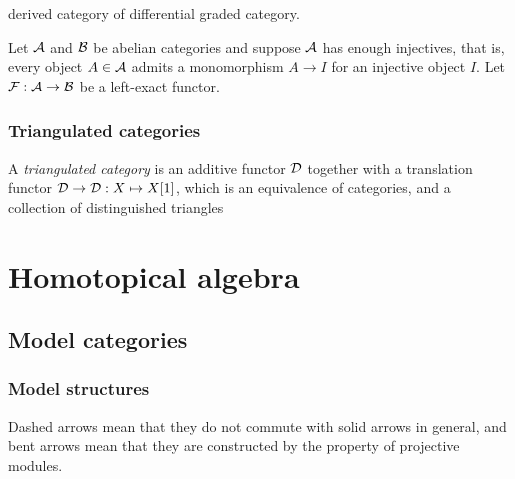 \documentclass{../../large}
\begin{document}
derived category of differential graded category.



\begin{prb}
Let $\mathcal{A}$ and $\mathcal{B}$ be abelian categories and suppose $\mathcal{A}$ has enough injectives, that is, every object $A\in\mathcal{A}$ admits a monomorphism $A\to I$ for an injective object $I$.
Let $\mathcal{F}:\mathcal{A}\to\mathcal{B}$ be a left-exact functor.

\end{prb}



\section{Triangulated categories}


\begin{prb}
A \emph{triangulated category} is an additive functor $\mathcal{D}$ together with a translation functor $\mathcal{D}\to\mathcal{D}:X\mapsto X[1]$, which is an equivalence of categories, and a collection of distinguished triangles 

\end{prb}




\chapter{}








\part{Homotopical algebra}

\chapter{Model categories}

\section{Model structures}


Dashed arrows mean that they do not commute with solid arrows in general, and bent arrows mean that they are constructed by the property of projective modules.
\end{document}
